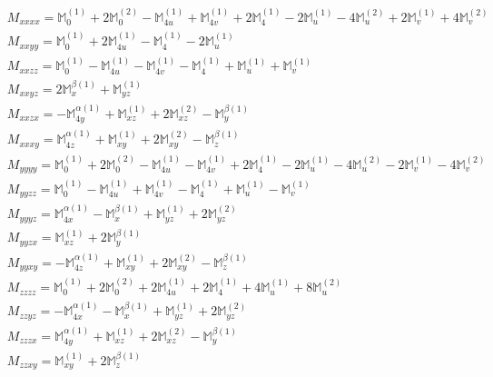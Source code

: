 \documentclass[fleqn,8pt,landscape]{jsarticle}
\begin{document}
\begin{align*}
& M_{xxxx} = \mathbb{M}_{0}^{(1)} + 2 \mathbb{M}_{0}^{(2)} - \mathbb{M}_{4u}^{(1)} + \mathbb{M}_{4v}^{(1)} + 2 \mathbb{M}_{4}^{(1)} - 2 \mathbb{M}_{u}^{(1)} - 4 \mathbb{M}_{u}^{(2)} + 2 \mathbb{M}_{v}^{(1)} + 4 \mathbb{M}_{v}^{(2)} \\
& M_{xxyy} = \mathbb{M}_{0}^{(1)} + 2 \mathbb{M}_{4u}^{(1)} - \mathbb{M}_{4}^{(1)} - 2 \mathbb{M}_{u}^{(1)} \\
& M_{xxzz} = \mathbb{M}_{0}^{(1)} - \mathbb{M}_{4u}^{(1)} - \mathbb{M}_{4v}^{(1)} - \mathbb{M}_{4}^{(1)} + \mathbb{M}_{u}^{(1)} + \mathbb{M}_{v}^{(1)} \\
& M_{xxyz} = 2 \mathbb{M}_{x}^{\beta(1)} + \mathbb{M}_{yz}^{(1)} \\
& M_{xxzx} = - \mathbb{M}_{4y}^{\alpha(1)} + \mathbb{M}_{xz}^{(1)} + 2 \mathbb{M}_{xz}^{(2)} - \mathbb{M}_{y}^{\beta(1)} \\
& M_{xxxy} = \mathbb{M}_{4z}^{\alpha(1)} + \mathbb{M}_{xy}^{(1)} + 2 \mathbb{M}_{xy}^{(2)} - \mathbb{M}_{z}^{\beta(1)} \\
& M_{yyyy} = \mathbb{M}_{0}^{(1)} + 2 \mathbb{M}_{0}^{(2)} - \mathbb{M}_{4u}^{(1)} - \mathbb{M}_{4v}^{(1)} + 2 \mathbb{M}_{4}^{(1)} - 2 \mathbb{M}_{u}^{(1)} - 4 \mathbb{M}_{u}^{(2)} - 2 \mathbb{M}_{v}^{(1)} - 4 \mathbb{M}_{v}^{(2)} \\
& M_{yyzz} = \mathbb{M}_{0}^{(1)} - \mathbb{M}_{4u}^{(1)} + \mathbb{M}_{4v}^{(1)} - \mathbb{M}_{4}^{(1)} + \mathbb{M}_{u}^{(1)} - \mathbb{M}_{v}^{(1)} \\
& M_{yyyz} = \mathbb{M}_{4x}^{\alpha(1)} - \mathbb{M}_{x}^{\beta(1)} + \mathbb{M}_{yz}^{(1)} + 2 \mathbb{M}_{yz}^{(2)} \\
& M_{yyzx} = \mathbb{M}_{xz}^{(1)} + 2 \mathbb{M}_{y}^{\beta(1)} \\
& M_{yyxy} = - \mathbb{M}_{4z}^{\alpha(1)} + \mathbb{M}_{xy}^{(1)} + 2 \mathbb{M}_{xy}^{(2)} - \mathbb{M}_{z}^{\beta(1)} \\
& M_{zzzz} = \mathbb{M}_{0}^{(1)} + 2 \mathbb{M}_{0}^{(2)} + 2 \mathbb{M}_{4u}^{(1)} + 2 \mathbb{M}_{4}^{(1)} + 4 \mathbb{M}_{u}^{(1)} + 8 \mathbb{M}_{u}^{(2)} \\
& M_{zzyz} = - \mathbb{M}_{4x}^{\alpha(1)} - \mathbb{M}_{x}^{\beta(1)} + \mathbb{M}_{yz}^{(1)} + 2 \mathbb{M}_{yz}^{(2)} \\
& M_{zzzx} = \mathbb{M}_{4y}^{\alpha(1)} + \mathbb{M}_{xz}^{(1)} + 2 \mathbb{M}_{xz}^{(2)} - \mathbb{M}_{y}^{\beta(1)} \\
& M_{zzxy} = \mathbb{M}_{xy}^{(1)} + 2 \mathbb{M}_{z}^{\beta(1)} \\

\end{align*}
\end{document}

